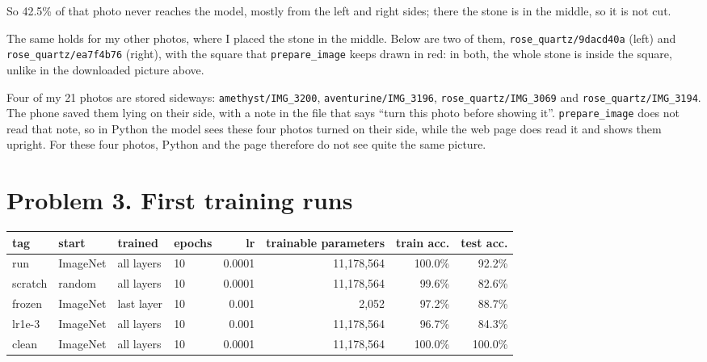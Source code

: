 \documentclass[11pt]{article}
\begin{document}
So 42.5\% of that photo never reaches the model, mostly from the left and right
sides; there the stone is in the middle, so it is not cut.

The same holds for my other photos, where I placed the stone in the middle. Below
are two of them, \texttt{rose\_quartz/9dacd40a} (left) and
\texttt{rose\_quartz/ea7f4b76} (right), with the square that
\texttt{prepare\_image} keeps drawn in red: in both, the whole stone is inside the
square, unlike in the downloaded picture above.

\begin{center}\end{center}

Four of my 21 photos are stored sideways: \texttt{amethyst/IMG\_3200},
\texttt{aventurine/IMG\_3196}, \texttt{rose\_quartz/IMG\_3069} and
\texttt{rose\_quartz/IMG\_3194}. The phone saved them lying on their side, with a
note in the file that says ``turn this photo before showing it''.
\texttt{prepare\_image} does not read that note, so in Python the model sees these
four photos turned on their side, while the web page does read it and shows them
upright. For these four photos, Python and the page therefore do not see quite
the same picture.
\section*{Problem 3. First training runs}

\begin{center}\footnotesize
\begin{tabular}{llllrrrr}
\toprule
tag & start & trained & epochs & lr & trainable parameters & train acc. & test acc. \\
\midrule
run & ImageNet & all layers & 10 & 0.0001 & 11,178,564 & 100.0\% & 92.2\% \\
scratch & random & all layers & 10 & 0.0001 & 11,178,564 & 99.6\% & 82.6\% \\
frozen & ImageNet & last layer & 10 & 0.001 & 2,052 & 97.2\% & 88.7\% \\
lr1e-3 & ImageNet & all layers & 10 & 0.001 & 11,178,564 & 96.7\% & 84.3\% \\
clean & ImageNet & all layers & 10 & 0.0001 & 11,178,564 & 100.0\% & 100.0\% \\
\bottomrule
\end{tabular}
\end{center}
\end{document}
